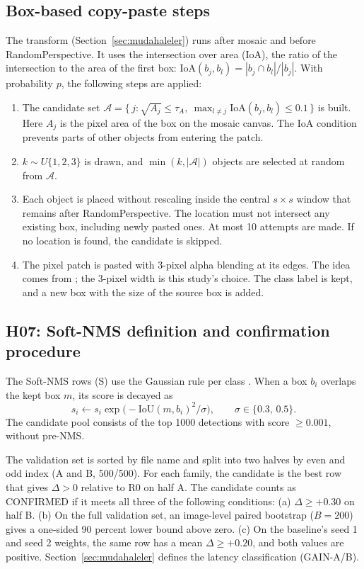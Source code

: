 \subsection{Box-based copy-paste steps}\label{sec:ek-cp}
The transform (Section~\ref{sec:mudahaleler}) runs after mosaic and before RandomPerspective. It uses the intersection over area (IoA), the ratio of the intersection to the area of the first box: $\mathrm{IoA}(b_j,b_l)=|b_j\cap b_l|/|b_j|$. With probability $p$, the following steps are applied:
\begin{enumerate}
\item The candidate set $\mathcal A=\{\,j:\sqrt{A_j}\le\tau_A,\ \max_{l\ne j}\mathrm{IoA}(b_j,b_l)\le0.1\,\}$ is built. Here $A_j$ is the pixel area of the box on the mosaic canvas. The IoA condition prevents parts of other objects from entering the patch.
\item $k\sim U\{1,2,3\}$ is drawn, and $\min(k,|\mathcal A|)$ objects are selected at random from $\mathcal A$.
\item Each object is placed without rescaling inside the central $s\times s$ window that remains after RandomPerspective. The location must not intersect any existing box, including newly pasted ones. At most 10 attempts are made. If no location is found, the candidate is skipped.
\item The pixel patch is pasted with 3-pixel alpha blending at its edges. The idea comes from \cite{dwibedi_2017_cutpaste}; the 3-pixel width is this study's choice. The class label is kept, and a new box with the size of the source box is added.
\end{enumerate}

\subsection{H07: Soft-NMS definition and confirmation procedure}\label{sec:ek-h07-dogrulama}
The Soft-NMS rows (S) use the Gaussian rule per class \cite{bodla_2017_softnms}. When a box $b_i$ overlaps the kept box $m$, its score is decayed as
\begin{equation}\label{eq:softnms}
s_i\leftarrow s_i\exp\!\bigl(-\mathrm{IoU}(m,b_i)^2/\sigma\bigr),\qquad\sigma\in\{0.3,\,0.5\}.
\end{equation}
The candidate pool consists of the top 1000 detections with score $\ge0.001$, without pre-NMS.

The validation set is sorted by file name and split into two halves by even and odd index (A and B, 500/500). For each family, the candidate is the best row that gives $\Delta>0$ relative to R0 on half A. The candidate counts as CONFIRMED if it meets all three of the following conditions:
(a) $\Delta\ge+0.30$ on half B.
(b) On the full validation set, an image-level paired bootstrap ($B=200$) gives a one-sided 90 percent lower bound above zero.
(c) On the baseline's seed 1 and seed 2 weights, the same row has a mean $\Delta\ge+0.20$, and both values are positive.
Section~\ref{sec:mudahaleler} defines the latency classification (GAIN-A/B).

